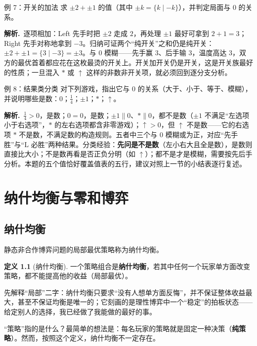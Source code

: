 \documentclass[UTF8,a4paper,11pt,oneside,openany,fontset=fandol]{ctexbook}
\theoremstyle{definition}
\newtheorem{definition}{定义}[chapter]
\newcommand{\sol}{\par\noindent\textbf{解析.}\ }
\begin{document}
\begin{problem}{例 7：开关的加法}
求 $\pm2+\pm1$ 的值（其中 $\pm k=\{k\mid -k\}$），并判定局面与 $0$ 的关系。
\end{problem}

\sol 逐项相加：Left 先手时把 $\pm2$ 走成 $2$，再处理 $\pm1$ 最好可拿到 $2+1=3$；Right 先手对称地拿到 $-3$。归纳可证两个“纯开关”之和仍是纯开关：$\pm2+\pm1=\{3\mid -3\}=\pm3$。与 $0$ 模糊——先手赢 $3$、后手输 $3$，温度高达 $3$，双方的最优首着都应花在这枚最烫的开关上。开关加开关仍是开关，这是开关族最好的性质；一旦混入 $\ast$ 或 $\uparrow$ 这样的非数非开关项，就必须回到逐分支分析。

\begin{problem}{例 8：结果类分类}
对下列游戏，指出它与 $0$ 的关系（大于、小于、等于、模糊），并说明哪些是数：$0$；$\tfrac14$；$\pm1$；$\ast$；$\uparrow$。
\end{problem}

\sol $\tfrac14>0$，是数；$0=0$，是数；$\pm1\parallel0$、$\ast\parallel0$，都不是数（$\pm1$ 不满足“左选项小于右选项”，$\ast$ 的左右选项都含非零游戏）；$\uparrow>0$，但 $\uparrow$ 不是数——它的右选项 $\ast$ 不是数，不满足数的构造规则。五者中三个与 $0$ 模糊或为正，对应“先手胜”与“L 必胜”两种结果。分类经验：\textbf{先问是不是数}（左小右大且全是数），是数则直接比大小；不是数再看是否正负分明（如 $\uparrow$）；都不是才是模糊，需要按先后手分析。本题的五个值恰好覆盖值表的五行，建议对照上一节的小结表逐行复述。



\chapter{纳什均衡与零和博弈}
\section{纳什均衡}
静态非合作博弈问题的局部最优策略称为纳什均衡。

\begin{definition}[纳什均衡]
一个策略组合是\textbf{纳什均衡}，若其中任何一个玩家单方面改变策略，都不能提高他的收益（局部最优）。
\end{definition}

先解释“局部”二字：纳什均衡只要求“没有人想单方面反悔”，并不保证整体收益最大，甚至不保证均衡是唯一的；它刻画的是理性博弈中一个“稳定”的拍板状态——给定别人的选择，我已经做了我能做的最好的事。

“策略”指的是什么？最简单的想法是：每名玩家的策略就是固定一种决策（\textbf{纯策略}）。然而，按照这个定义，纳什均衡不一定存在。
\end{document}
